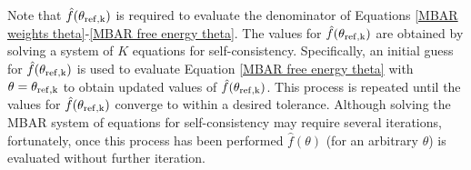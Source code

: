 \documentclass[journal=jced,manuscript=article]{achemso}
\newcommand{\bfv}[1]{{\mbox{\boldmath{$#1$}}}}
\newcommand{\x}{\bfv{x}}
\begin{document}

Note that $\hat f(\theta_{\rm ref,k})$ is required to evaluate the denominator of Equations \ref{MBAR weights theta}-\ref{MBAR free energy theta}. The values for $\hat f(\theta_{\rm ref,k})$ are obtained by solving a system of $K$ equations for self-consistency. Specifically, an initial guess for $\hat f(\theta_{\rm ref,k})$ is used to evaluate Equation \ref{MBAR free energy theta} with $\theta=\theta_{\rm ref,k}$ to obtain updated values of $\hat f(\theta_{\rm ref,k})$. This process is repeated until the values for $\hat f(\theta_{\rm ref,k})$ converge to within a desired tolerance. Although solving the MBAR system of equations for self-consistency may require several iterations, fortunately, once this process has been performed $\hat f(\theta)$ (for an arbitrary $\theta$) is evaluated without further iteration.
\end{document}

